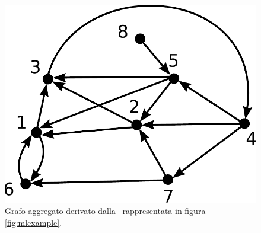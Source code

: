 \begin{figure}
    \centering
    \includegraphics[height=0.15865384615384615\textheight]{img/aggexample1.pdf}
    \caption{Grafo aggregato derivato dalla \muln\ rappresentata in figura \ref{fig:mlexample}.}
    \label{fig:graggexample}
\end{figure}
